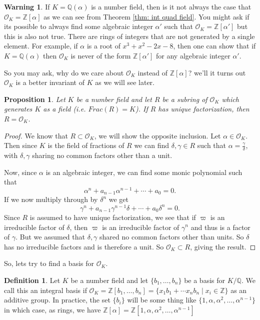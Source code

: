 \documentclass[11pt,a4paper]{report}
\theoremstyle{plain}
\newtheorem{prop}[subsection]{Proposition}
\theoremstyle{definition}
\newtheorem{definition}[subsection]{Definition}
\theoremstyle{definition}
\newtheorem{warn}[subsection]{Warning}
\newcommand{\ZZ}{\mathbb{Z}}
\def\QQ{\mathbb{Q}}
\def \a{\alpha}
\def \g {\gamma}
\def \OO {\mathcal{O}}
\begin{document}
	\begin{warn}
		If $K=\QQ(\a)$ is a number field, then is it not always the case that $\OO_K=\ZZ[\a]$ as we can see from Theorem \ref{thm: int quad field}. You might ask if its possible to always find some algebraic integer $\a'$ such that $\OO_K=\ZZ[\a']$ but this is also not true. There are rings of integers that are not generated by a single element. For example, if $\a$ is a root of $x^3+x^2-2x-8$, then one can show that if $K=\QQ(\a)$ then $\OO_K$ is never of the form $\ZZ[\a']$ for any algebraic integer $\a'$.
	\end{warn}
	
	
	So you may ask, why do we care about $\OO_K$ instead of $\ZZ[\a]$? we'll it turns out $\OO_K$ is a better invariant of $K$ as we will see later. 
	
	\begin{prop}
		Let $K$ be a number field and let $R$ be a subring of $\OO_K$ which generates $K$ as a field (i.e. $Frac(R)=K$).  If $R$ has unique factorization, then $R=\OO_K$.
	\end{prop}
	
	\begin{proof}
		We know that $R \subset \OO_K$, we will show the opposite inclusion. Let $\a \in \OO_K$. Then since $K$ is the field of fractions of $R$ we can find $\delta,\gamma \in R$ such that $\a=\frac{\gamma}{\delta}$, with $\delta,\gamma$ sharing no common factors other than a unit. 
		
		Now, since $\a$ is an algebraic integer, we can find some monic polynomial such that \[\a^n+a_{n-1}\a^{n-1}+\cdots+a_0=0.\] If we now multiply through by $\delta^n$ we get  \[\gamma^n+a_{n-1}\g^{n-1}\delta+\cdots+a_0\delta^n=0.\] Since $R$ is assumed to have unique factorization, we see that if $\varpi$ is an irreducible factor of $\delta$, then $\varpi$ is an irreducible factor of $\gamma^n$ and thus is a factor of $\gamma$. But we assumed that $\delta,\gamma$ shared no common factors other than units. So $\delta$ has no irreducible factors and is therefore a unit. So $\OO_K \subset R$, giving the result.
	\end{proof}
	
	So, lets try to find a basis for $\OO_K$. 
	
	\begin{definition}\label{definition: int basis}
		Let $K$ be a number field and let $\{b_1,\dots,b_n\}$ be a basis for $K/\QQ$. We call this an integral basis if $\OO_K=\ZZ[b_1,\dots,b_n]=\{x_1b_1+\cdots x_nb_n \mid x_i \in \ZZ\}$ as an additive group.  In practice, the set $\{b_i\}$ will be some thing like $\{1,\a,\a^2,\dots,\a^{n-1}\}$ in which case, as rings, we have $\ZZ[\a]=\ZZ[1,\a,\a^2,\dots,\a^{n-1}]$
	\end{definition}
	
\end{document}
